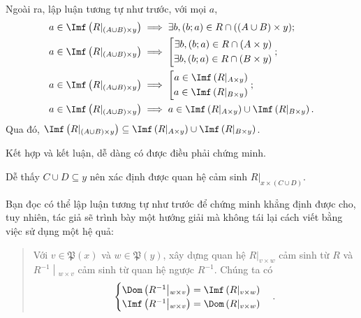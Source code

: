 Ngoài ra, lập luận tương tự như trước, với mọi $a$, 
\begin{align*}
   a \in \Imf\left(R|_{(A \cup B) \times y}\right) &\implies \exists b, (b; a) \in R \cap ((A \cup B) \times y); \\
   a \in \Imf\left(R|_{(A \cup B) \times y}\right) &\implies \left[ \begin{aligned}
      \exists b, (b; a) \in R \cap (A \times y) \\ 
      \exists b, (b; a) \in R \cap (B \times y) 
   \end{aligned}\right.; \\
   a \in \Imf\left(R|_{(A \cup B) \times y}\right) &\implies \left[ \begin{aligned}
      a \in \Imf\left(R|_{A \times y}\right) \\
      a \in \Imf\left(R|_{B \times y}\right)
   \end{aligned}\right.; \\
   a \in \Imf\left(R|_{(A \cup B) \times y}\right) &\implies a \in \Imf\left(R|_{A \times y}\right) \cup \Imf\left(R|_{B \times y}\right).
\end{align*}
Qua đó, $\Imf\left(R|_{(A \cup B) \times y}\right) \subseteq \Imf\left(R|_{A \times y}\right) \cup \Imf\left(R|_{B \times y}\right)$. 

Kết hợp và kết luận, dễ dàng có được điều phải chứng minh.

\stepSubexercise Dễ thấy $C \cup D \subseteq y$ nên xác định được quan hệ cảm sinh $R|_{x \times (C \cup D)}$.

Bạn đọc có thể lập luận tương tự như trước để chứng minh khẳng định được cho, tuy nhiên, tác giả sẽ trình bày một hướng giải mà không tái lại cách viết bằng việc sử dụng một hệ quả: 
\begin{quotation}
   Với $v \in \mathfrak{P}(x)$ và $w \in \mathfrak{P}(y)$, xây dựng quan hệ $R|_{v \times w}$ cảm sinh từ $R$ và $\left.R^{-1}\middle|_{w \times v}\right.$ cảm sinh từ quan hệ ngược $R^{-1}$. Chúng ta có \begin{equation*}
      \begin{cases}
         \Dom\left(R^{-1}\middle|_{w \times v}\right) = \Imf\left(R|_{v \times w}\right) \\
         \Imf\left(R^{-1}\middle|_{w \times v}\right) = \Dom\left(R|_{v \times w}\right)
      \end{cases}.
   \end{equation*} 
\end{quotation}

